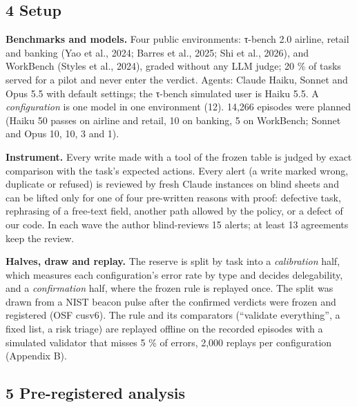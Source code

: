\subsection{4 Setup}\label{setup}

\textbf{Benchmarks and models.} Four public environments: τ-bench 2.0 airline, retail and banking (Yao et al., 2024; Barres et al., 2025; Shi et al., 2026), and WorkBench (Styles et al., 2024), graded without any LLM judge; 20 \% of tasks served for a pilot and never enter the verdict. Agents: Claude Haiku, Sonnet and Opus 5.5 with default settings; the τ-bench simulated user is Haiku 5.5. A \emph{configuration} is one model in one environment (12). 14,266 episodes were planned (Haiku 50 passes on airline and retail, 10 on banking, 5 on WorkBench; Sonnet and Opus 10, 10, 3 and 1).

\textbf{Instrument.} Every write made with a tool of the frozen table is judged by exact comparison with the task's expected actions. Every alert (a write marked wrong, duplicate or refused) is reviewed by fresh Claude instances on blind sheets and can be lifted only for one of four pre-written reasons with proof: defective task, rephrasing of a free-text field, another path allowed by the policy, or a defect of our code. In each wave the author blind-reviews 15 alerts; at least 13 agreements keep the review.

\textbf{Halves, draw and replay.} The reserve is split by task into a \emph{calibration} half, which measures each configuration's error rate by type and decides delegability, and a \emph{confirmation} half, where the frozen rule is replayed once. The split was drawn from a NIST beacon pulse after the confirmed verdicts were frozen and registered (OSF cusv6). The rule and its comparators (``validate everything'', a fixed list, a risk triage) are replayed offline on the recorded episodes with a simulated validator that misses 5 \% of errors, 2,000 replays per configuration (Appendix B).

\subsection{5 Pre-registered analysis}\label{pre-registered-analysis}


